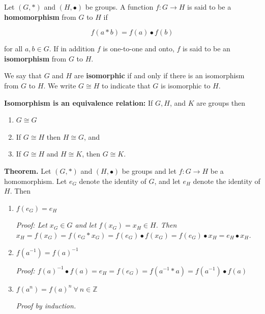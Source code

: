 \documentclass{article}
\begin{document}
Let \((G, *)\) and \((H, \bullet)\)  be groups. A function \(f : G \to H\) is said to be a \textbf{homomorphism} from \(G\) to \(H\) if

\[
f(a * b) = f(a) \bullet f(b)
\]

for all \(a, b \in G\). If in addition \(f\) is one-to-one and onto, \(f\) is said to be an \textbf{isomorphism} from \(G\) to \(H\).

We say that \(G\) and \(H\) are \textbf{isomorphic} if and only if there is an isomorphism from \(G\) to \(H\). We write \(G \cong H\) to indicate that \(G\) is isomorphic to \(H\).

\textbf{Isomorphism is an equivalence relation:} If \(G, H\), and \(K\) are groups then

\begin{enumerate}[1.]

\item \(G \cong G\)

\item If \(G \cong H\) then \(H \cong G\), and

\item If \(G \cong H\) and \(H \cong K\), then \(G \cong K\).

\end{enumerate}

\textbf{Theorem.} Let \((G, *)\) and \((H, \bullet)\) be groups and let \(f: G \to H\) be a homomorphism. Let \(e_G\) denote the identity of \(G\), and let \(e_H\) denote the identity of \(H\). Then

\begin{enumerate}[1.]

\item \(f(e_G) = e_H\)

\begin{center}
\textit{Proof: Let \(x_G \in G\) and let \(f(x_G) = x_H \in H\). Then \(x_H = f(x_G) = f(e_G * x_G) = f(e_G) \bullet f(x_G) = f(e_G) \bullet x_H = e_H \bullet x_H\).}
\end{center}

\item \(f(a^{-1}) = f(a)^{-1}\)

\begin{center}
\textit{Proof: \(f(a)^{-1} \bullet f(a) = e_H = f(e_G) = f(a^{-1} * a) = f(a^{-1}) \bullet f(a)\)}
\end{center}

\item \(f(a^n) = f(a)^n \ \forall \ n \in \mathbb{Z}\)

\begin{center}
\textit{Proof by induction.}
\end{center}

\end{enumerate}
\end{document}
